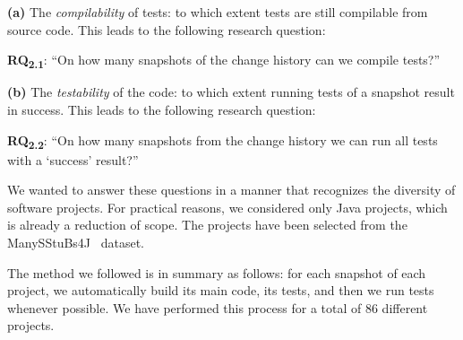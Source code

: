 
\textbf{(a)} The \textit{compilability} of tests: to which extent tests are still compilable from source code. 
This leads to the following research question:

\def \RQI{On how many snapshots of the change history can we compile tests?}

\textbf{RQ\textsubscript{2.1}}: ``\RQI''

\textbf{(b)} The \textit{testability} of the code: to which extent running tests of a snapshot result in success. 
This leads to the following research question:


\def \RQII{On how many snapshots from the change history we can run all tests with a `success' result?}

\textbf{RQ\textsubscript{2.2}}: ``\RQII''


We wanted to answer these questions in a manner that recognizes the diversity of software projects. 
For practical reasons, we considered only Java projects, which is already a reduction of scope. 
The projects have been selected from the ManySStuBs4J~\cite{karampatsis2020often} dataset.

The method we followed is in summary as follows: for each snapshot of each project, we automatically build its main code, its tests, and then we run tests whenever possible. 
We have performed this process for a total of 86 different projects.

